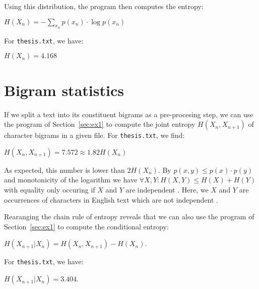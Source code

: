 \documentclass[10pt,a4paper,oneside,onecolumn]{article}
\newcommand*{\thesisTXT}{{\tt thesis.txt}\xspace}
\begin{document}
Using this distribution\footnotemark, the program then computes the entropy:

\begin{center}
    $H(X_n) = -\sum\limits_{x_n} p(x_n) \cdot \log p(x_n)$
\end{center}

For \thesisTXT, we have:

\begin{center}
    $H(X_n) = 4.168$\footnotemark
\end{center}

\section{Bigram statistics}\label{sec:ex2}

If we split a text into its constituent bigrams as a pre-procesing step, we can
use the program of Section~\ref{sec:ex1} to compute the joint entropy $H(X_n,
X_{n+1})$ of character bigrams in a given file. For \thesisTXT, we find:

\begin{center}
    $H(X_n, X_{n+1}) = 7.572 \approx 1.82H(X_n)$\footnotemark
\end{center}

As expected, this number is lower than $2H(X_n)$. By $p(x,y) \le p(x) \cdot
p(y)$ and monotonicity of the logarithm we have $\forall X,Y: H(X, Y) \le H(X) +
H(Y)$ with equality only occuring if $X$ and $Y$ are independent
\cite[p.~138]{mackay}. Here, we $X$ and $Y$ are occurrences of characters in
English text which are not independent \cite[p.~22-24]{mackay}.

Rearanging the chain rule of entropy \cite[p.~139]{mackay} reveals that we can
also use the program of Section~\ref{sec:ex1} to compute the conditional
entropy:

\begin{center}
    $H(X_{n+1} | X_n) = H(X_n, X_{n+1}) - H(X_n)$.
\end{center}

For \thesisTXT, we have:

\begin{center}
    $H(X_{n+1} | X_n) = 3.404$.
\end{center}
\end{document}

